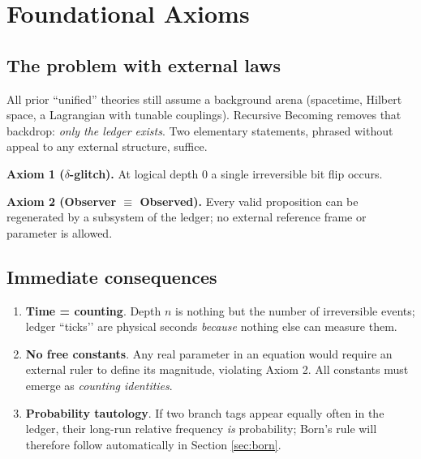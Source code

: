 \section{Foundational Axioms}
\label{sec:axioms}

\subsection{The problem with external laws}

All prior “unified” theories still assume a background arena
(spacetime, Hilbert space, a Lagrangian with tunable couplings).
Recursive Becoming removes that backdrop: \emph{only the ledger
exists}.  Two elementary statements, phrased without appeal to any
external structure, suffice.

\begin{axiombox}
\textbf{Axiom 1 ($\delta$-glitch).}  
At logical depth 0 a single irreversible bit flip occurs.
\end{axiombox}

\begin{axiombox}
\textbf{Axiom 2 (Observer $\boldsymbol{\equiv}$ Observed).}  
Every valid proposition can be regenerated by a subsystem of the
ledger; no external reference frame or parameter is allowed.
\end{axiombox}

\subsection{Immediate consequences}

\begin{enumerate}
  \item \textbf{Time = counting}.  Depth $n$ is nothing but the number
        of irreversible events; ledger “ticks’’ are physical seconds
        \emph{because} nothing else can measure them.
  \item \textbf{No free constants}.  Any real parameter in an equation
        would require an external ruler to define its magnitude,
        violating Axiom 2.  All constants must emerge as
        \emph{counting identities}.
  \item \textbf{Probability tautology}.  If two branch tags appear
        equally often in the ledger, their long-run relative frequency
        \emph{is} probability; Born’s rule will therefore follow
        automatically in Section \ref{sec:born}.
\end{enumerate}

